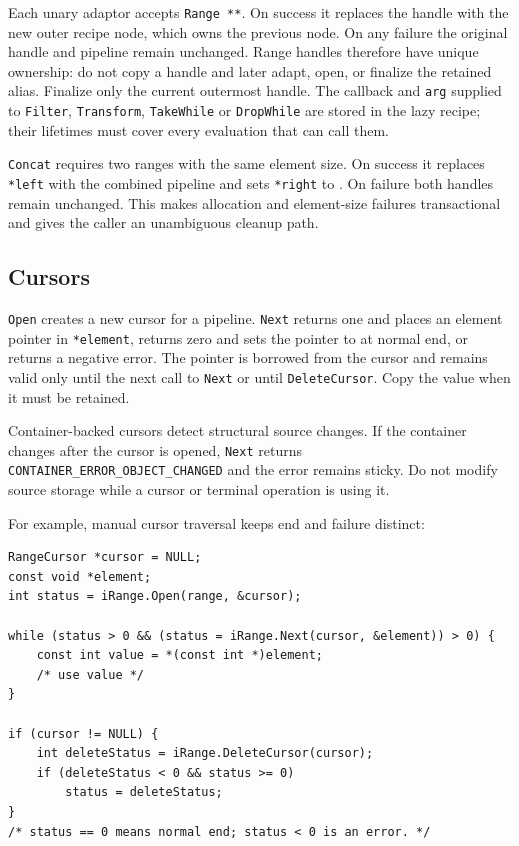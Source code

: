 Each unary adaptor accepts \verb|Range **|.  On success it replaces the
handle with the new outer recipe node, which owns the previous node.  On any
failure the original handle and pipeline remain unchanged.  Range handles
therefore have unique ownership: do not copy a handle and later adapt, open,
or finalize the retained alias.  Finalize only the current outermost handle.
The callback and \verb|arg| supplied to \verb|Filter|, \verb|Transform|,
\verb|TakeWhile| or \verb|DropWhile| are stored in the lazy recipe; their
lifetimes must cover every evaluation that can call them.

\verb|Concat| requires two ranges with the same element size.  On success it
replaces \verb|*left| with the combined pipeline and sets \verb|*right| to
\Null.  On failure both handles remain unchanged.  This makes allocation and
element-size failures transactional and gives the caller an unambiguous
cleanup path.

\subsection{Cursors}

\verb|Open| creates a new cursor for a pipeline.  \verb|Next| returns one and
places an element pointer in \verb|*element|, returns zero and sets the pointer
to \Null at normal end, or returns a negative error.  The pointer is borrowed
from the cursor and remains valid only until the next call to \verb|Next| or
until \verb|DeleteCursor|.  Copy the value when it must be retained.

Container-backed cursors detect structural source changes.  If the container
changes after the cursor is opened, \verb|Next| returns
\verb|CONTAINER_ERROR_OBJECT_CHANGED| and the error remains sticky.  Do not
modify source storage while a cursor or terminal operation is using it.

For example, manual cursor traversal keeps end and failure distinct:

\begin{verbatim}
RangeCursor *cursor = NULL;
const void *element;
int status = iRange.Open(range, &cursor);

while (status > 0 && (status = iRange.Next(cursor, &element)) > 0) {
    const int value = *(const int *)element;
    /* use value */
}

if (cursor != NULL) {
    int deleteStatus = iRange.DeleteCursor(cursor);
    if (deleteStatus < 0 && status >= 0)
        status = deleteStatus;
}
/* status == 0 means normal end; status < 0 is an error. */
\end{verbatim}

